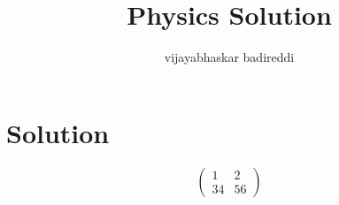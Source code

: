 \documentclass[12pt]{article}
\title{Physics Solution}
\author{vijayabhaskar badireddi}
\date{}
\begin{document}

\section*{Solution}
\begin{equation}
\begin{pmatrix}
1 & 2  \\ 34 & 56 
\end{pmatrix}
\end{equation}
\end{document}
